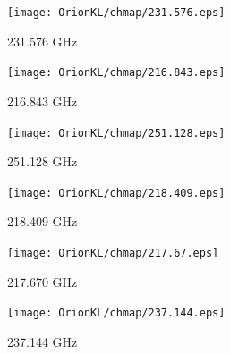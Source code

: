\begin{figure}[htbp]
  \centering
  \texttt{[image: OrionKL/chmap/231.576.eps]}
  \caption{231.576 GHz}
  \label{ap_ch_12}
\end{figure}

\begin{figure}[htbp]
  \centering
  \texttt{[image: OrionKL/chmap/216.843.eps]}
  \caption{216.843 GHz}
  \label{ap_ch_13}
\end{figure}

\begin{figure}[htbp]
  \centering
  \texttt{[image: OrionKL/chmap/251.128.eps]}
  \caption{251.128 GHz}
  \label{ap_ch_14}
\end{figure}

\begin{figure}[htbp]
  \centering
  \texttt{[image: OrionKL/chmap/218.409.eps]}
  \caption{218.409 GHz}
  \label{ap_ch_15}
\end{figure}

\begin{figure}[htbp]
  \centering
  \texttt{[image: OrionKL/chmap/217.67.eps]}
  \caption{217.670 GHz}
  \label{ap_ch_16}
\end{figure}

\begin{figure}[htbp]
  \centering
  \texttt{[image: OrionKL/chmap/237.144.eps]}
  \caption{237.144 GHz}
  \label{ap_ch_17}
\end{figure}